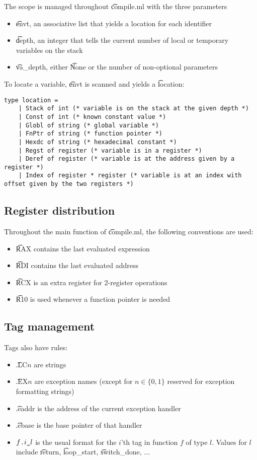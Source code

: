 The scope is managed throughout \t{compile.ml} with the three parameters
\begin{itemize}
    \item \t{envt}, an associative list that yields a location for each identifier
    \item \t{depth}, an integer that tells the current number of local or temporary variables on the stack
    \item \t{va\_depth}, either \t{None} or the number of non-optional parameters
\end{itemize}

To locate a variable, \t{envt} is scanned and yields a \t{location}:
\begin{verbatim}
type location =
    | Stack of int (* variable is on the stack at the given depth *)
    | Const of int (* known constant value *)
    | Globl of string (* global variable *)
    | FnPtr of string (* function pointer *)
    | Hexdc of string (* hexadecimal constant *)
    | Regst of register (* variable is in a register *)
    | Deref of register (* variable is at the address given by a register *)
    | Index of register * register (* variable is at an index with offset given by the two registers *)
\end{verbatim}

\subsection{Register distribution}

Throughout the main function of \t{compile.ml}, the following conventions are used:
\begin{itemize}
    \item \t{RAX} contains the last evaluated expression
    \item \t{RDI} contains the last evaluated address
    \item \t{RCX} is an extra register for 2-register operations
    \item \t{R10} is used whenever a function pointer is needed
\end{itemize}

\subsection{Tag management}
Tags also have rules:
\begin{itemize}
    \item \t{.LC}\(n\) are strings
    \item \t{.EX}\(n\) are exception names (except for \(n\in \{ 0, 1 \}\) reserved for exception formatting strings)
    \item \t{.eaddr} is the address of the current exception handler
    \item \t{.ebase} is the base pointer of that handler
    \item \(f\texttt{.}i\texttt{\_}l\) is the usual format for the \(i\)'th tag in function \(f\) of type \(l\). Values for \(l\) include \t{return}, \t{loop\_start}, \t{switch\_done}, ...
\end{itemize}

